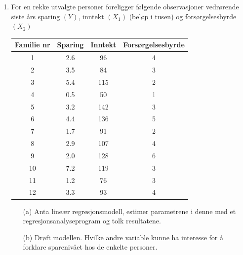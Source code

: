 \begin{enumerate}
\item
For en rekke utvalgte personer foreligger følgende observasjoner
vedrørende siste års sparing $(Y)$, inntekt $(X_1)$ (beløp i tusen)
og forsørgelsesbyrde $(X_2)$
\begin{center}
\begin{tabular}{|c|ccc|} \hline
Familie nr   &  Sparing   &  Inntekt  &   Forsørgelsesbyrde \\ \hline
    1           &     2.6        &      96       &             4 \\
    2           &     3.5        &      84       &             3 \\
    3           &     5.4        &     115       &             2 \\
    4           &     0.5        &      50       &             1 \\
    5           &     3.2        &     142       &             3 \\
    6           &     4.4        &     136       &             5 \\
    7           &     1.7        &      91       &             2 \\
    8           &     2.9        &     107       &             4 \\
    9           &     2.0        &     128       &             6 \\
   10           &     7.2        &     119       &             3 \\
   11           &     1.2        &      76       &             3 \\
   12           &     3.3        &      93       &             4 \\ \hline
\end{tabular}
\end{center}
\begin{itemize}
\item[(a)] Anta lineær regresjonsmodell, estimer parametrene i denne
med et regresjonsanalyseprogram og tolk resultatene.
\item[(b)] Drøft modellen.  Hvilke andre variable kunne ha interesse for
å forklare sparenivået hos de enkelte personer.
\end{itemize}


\end{enumerate}
